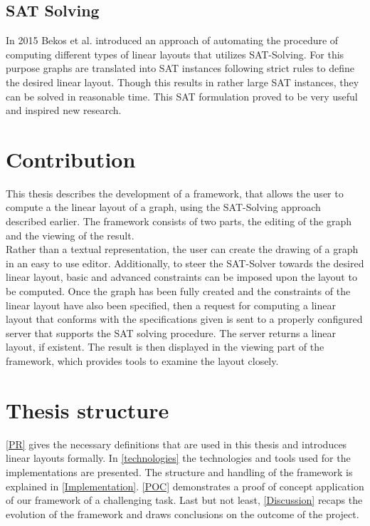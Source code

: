 \subsection{SAT Solving}
In 2015 Bekos et al.\cite{Bekos2015TheBE} introduced an approach of automating the procedure of computing different types of linear layouts that utilizes SAT-Solving. For this purpose graphs are translated into SAT instances following strict rules to define the desired linear layout. Though this results in rather large SAT instances, they can be solved in reasonable time. This SAT formulation proved to be very useful and inspired new research.
\section{Contribution}
This thesis describes the development of a framework, that allows the user to compute a the linear layout of a graph, using the SAT-Solving approach described earlier. The framework consists of two parts, the editing of the graph and the viewing of the result.\\
Rather than a textual representation, the user can create the drawing of a graph in an easy to use editor. Additionally, to steer the SAT-Solver towards the desired linear layout, basic and advanced constraints can be imposed upon the layout to be computed. Once the graph has been fully created and the constraints of the linear layout have also been specified, then a request for computing a linear layout that conforms with the specifications given is sent to a properly configured server that supports the SAT solving procedure. The server returns a linear layout, if existent. The result is then displayed in the viewing part of the framework, which provides tools to examine the layout closely.
\section{Thesis structure}
\autoref{PR} gives the necessary definitions that are used in this thesis and introduces linear layouts formally.
In \autoref{technologies} the technologies and tools used for the implementations are presented.
The structure and handling of the framework is explained in \autoref{Implementation}.
\autoref{POC} demonstrates a proof of concept application of our framework of a challenging task.
Last but not least, \autoref{Discussion} recaps the evolution of the framework and draws conclusions on the outcome of the project.
